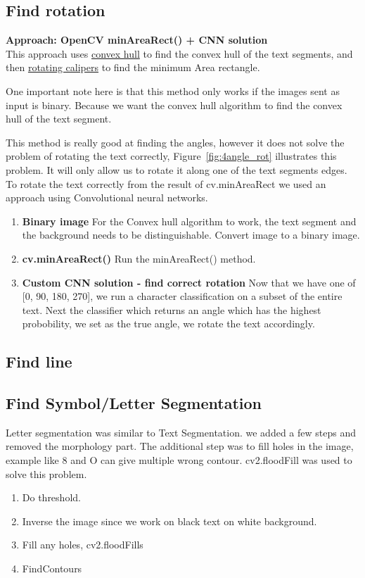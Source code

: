 \documentclass[11pt,a4paper,UKenglish]{report}
\begin{document}
\subsection{Find rotation}
\begin{flushleft}
  \textbf{Approach: OpenCV minAreaRect() + CNN solution} \\
  This approach uses \href{https://en.wikipedia.org/wiki/Convex_hull}{convex hull}
  to find the convex hull of the text segments, and then
  \href{https://en.wikipedia.org/wiki/Rotating_calipers}{rotating calipers} to
  find the minimum Area rectangle. \par
  One important note here is that this method only works if the images sent as
  input is binary. Because we want the convex hull algorithm to find the convex
  hull of the text segment. \par
  This method is really good at finding the angles, however it does not solve the
  problem of rotating the text correctly, Figure~\ref{fig:4angle_rot} illustrates
  this problem. It will only allow us to rotate it along one of the text
  segments edges. To rotate the text correctly from the result of cv.minAreaRect
  we used an approach using Convolutional neural networks.

  \begin{enumerate}
    \item \textbf{Binary image}
    For the Convex hull algorithm to work, the text segment and the background
    needs to be distinguishable. Convert image to a binary image.
    \item \textbf{cv.minAreaRect()}
    Run the minAreaRect() method.
    \item \textbf{Custom CNN solution - find correct rotation}
    Now that we have one of [0\textdegree, 90\textdegree, 180\textdegree,
    270\textdegree], we run a character classification on a subset of the
    entire text. Next the classifier which returns an angle which has the
    highest probobility, we set as the true angle, we rotate the text
    accordingly.
  \end{enumerate}
\end{flushleft}


\subsection{Find line}


\subsection{Find Symbol/Letter Segmentation}
Letter segmentation was similar to Text Segmentation. we added a few steps and removed the morphology part. The additional step was to fill holes in the image, example like 8 and O can give multiple wrong contour. cv2.floodFill was used to solve this problem.
\begin{enumerate}
  \item Do threshold.
  \item Inverse the image since we work on black text on white background.
  \item Fill any holes, cv2.floodFills
  \item FindContours
\end{enumerate}
\end{document}
